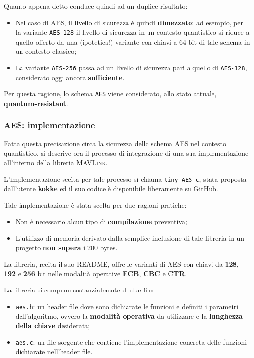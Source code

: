 \documentclass[a4paper, 12pt, oneside]{article}
\theoremstyle{definition}
\begin{document}
Quanto appena detto conduce quindi ad un duplice risultato:

\begin{itemize}
    \item Nel caso di AES, il livello di sicurezza è quindi \textbf{dimezzato}: ad esempio, per la variante \texttt{AES-128} il livello di sicurezza in un contesto quantistico si riduce a quello offerto da una (ipotetica!) variante con chiavi a 64 bit di tale schema in un contesto classico;
    \item La variante \texttt{AES-256} passa ad un livello di sicurezza pari a quello di \texttt{AES-128}, considerato oggi ancora \textbf{sufficiente}.
\end{itemize}

Per questa ragione, lo schema \texttt{AES} viene considerato, allo stato attuale, \textbf{quantum-resistant}.

\subsubsection{AES: implementazione}
Fatta questa precisazione circa la sicurezza dello schema AES nel contesto quantistico, si descrive ora il processo di integrazione di una sua implementazione all'interno della libreria \textsc{MAVLink}.

L'implementazione scelta per tale processo si chiama \texttt{tiny-AES-c}, stata proposta dall'utente \textbf{kokke} ed il suo codice è disponibile liberamente su GitHub. \cite{tiny-aes-c-github}

Tale implementazione è stata scelta per due ragioni pratiche:

\begin{itemize}
    \item Non è necessario alcun tipo di \textbf{compilazione} preventiva;
    \item L'utilizzo di memoria derivato dalla semplice inclusione di tale libreria in un progetto \textbf{non supera} i 200 bytes. 
\end{itemize}

La libreria, recita il suo README, offre le varianti di AES con chiavi da \textbf{128}, \textbf{192} e \textbf{256} bit nelle modalità operative \textbf{ECB}, \textbf{CBC} e \textbf{CTR}.

La libreria si compone sostanzialmente di due file:

\begin{itemize}
    \item \texttt{aes.h}: un header file dove sono dichiarate le funzioni e definiti i parametri dell'algoritmo, ovvero la \textbf{modalità operativa} da utilizzare e la \textbf{lunghezza della chiave} desiderata;
    \item \texttt{aes.c}: un file sorgente che contiene l'implementazione concreta delle funzioni dichiarate nell'header file.
\end{itemize}
\end{document}
